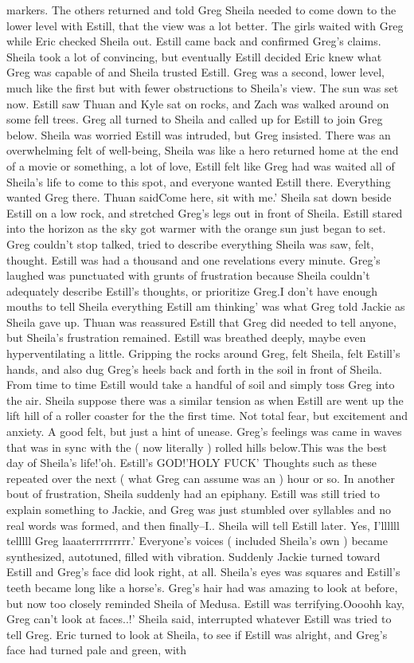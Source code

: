 \documentclass[12pt]{book}
\begin{document}
markers. The others returned and told Greg Sheila needed to come down to the lower level with Estill, that the view was a lot better. The girls waited with Greg while Eric checked Sheila out. Estill came back and confirmed Greg's claims. Sheila took a lot of convincing, but eventually Estill decided Eric knew what Greg was capable of and Sheila trusted Estill. Greg was a second, lower level, much like the first but with fewer obstructions to Sheila's view. The sun was set now. Estill saw Thuan and Kyle sat on rocks, and Zach was walked around on some fell trees. Greg all turned to Sheila and called up for Estill to join Greg below. Sheila was worried Estill was intruded, but Greg insisted. There was an overwhelming felt of well-being, Sheila was like a hero returned home at the end of a movie or something, a lot of love, Estill felt like Greg had was waited all of Sheila's life to come to this spot, and everyone wanted Estill there. Everything wanted Greg there. Thuan saidCome here, sit with me.' Sheila sat down beside Estill on a low rock, and stretched Greg's legs out in front of Sheila. Estill stared into the horizon as the sky got warmer with the orange sun just began to set. Greg couldn't stop talked, tried to describe everything Sheila was saw, felt, thought. Estill was had a thousand and one revelations every minute. Greg's laughed was punctuated with grunts of frustration because Sheila couldn't adequately describe Estill's thoughts, or prioritize Greg.I don't have enough mouths to tell Sheila everything Estill am thinking' was what Greg told Jackie as Sheila gave up. Thuan was reassured Estill that Greg did needed to tell anyone, but Sheila's frustration remained. Estill was breathed deeply, maybe even hyperventilating a little. Gripping the rocks around Greg, felt Sheila, felt Estill's hands, and also dug Greg's heels back and forth in the soil in front of Sheila. From time to time Estill would take a handful of soil and simply toss Greg into the air. Sheila suppose there was a similar tension as when Estill are went up the lift hill of a roller coaster for the the first time. Not total fear, but excitement and anxiety. A good felt, but just a hint of unease. Greg's feelings was came in waves that was in sync with the ( now literally ) rolled hills below.This was the best day of Sheila's life!'oh. Estill's GOD!'HOLY FUCK' Thoughts such as these repeated over the next ( what Greg can assume was an ) hour or so. In another bout of frustration, Sheila suddenly had an epiphany. Estill was still tried to explain something to Jackie, and Greg was just stumbled over syllables and no real words was formed, and then finally--I.. Sheila will tell Estill later. Yes, I'llllll telllll Greg laaaterrrrrrrrr.' Everyone's voices ( included Sheila's own ) became synthesized, autotuned, filled with vibration. Suddenly Jackie turned toward Estill and Greg's face did look right, at all. Sheila's eyes was squares and Estill's teeth became long like a horse's. Greg's hair had was amazing to look at before, but now too closely reminded Sheila of Medusa. Estill was terrifying.Oooohh kay, Greg can't look at faces..!' Sheila said, interrupted whatever Estill was tried to tell Greg. Eric turned to look at Sheila, to see if Estill was alright, and Greg's face had turned pale and green, with 
\end{document}
